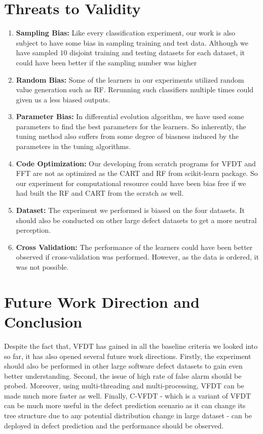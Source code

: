 \documentclass[sigplan]{acmart}\settopmatter{printfolios=true,printccs=false,printacmref=false}
\begin{document}
\section{Threats to Validity}
\begin{enumerate}
	\item \textbf{Sampling Bias: } Like every classification experiment, our work is also subject to have some bias in sampling training and test data. Although we have sampled $10$ disjoint training and testing datasets for each dataset, it could have been better if the sampling number was higher
	\item \textbf{Random Bias: } Some of the learners in our experiments utilized random value generation such as RF. Rerunning such classifiers multiple times could given us a less biased outputs.
	\item \textbf{Parameter Bias: } In differential evolution algorithm, we have used some parameters to find the best parameters for the learners. So inherently, the tuning method also suffers from some degree of biasness induced by the parameters in the tuning algorithms.
	\item \textbf{Code Optimization: } Our developing from scratch programs for VFDT and FFT are not as optimized as the CART and RF from scikit-learn package. So our experiment for computational resource could have been bias free if we had built the RF and CART from the scratch as well.
	\item \textbf{Dataset: } The experiment we performed is biased on the four datasets. It should also be conducted on other large defect datasets to get a more neutral perception.
	\item \textbf{Cross Validation: } The performance of the learners could have been better observed if cross-validation was performed. However, as the data is ordered, it was not possible.
\end{enumerate}

\section{Future Work Direction and Conclusion}
Despite the fact that, VFDT has gained in all the baseline criteria we looked into so far, it has also opened several future work directions. Firstly, the experiment should also be performed in other large software defect datasets to gain even better understanding. Second, the issue of high rate of false alarm should be probed. Moreover, using multi-threading and multi-processing, VFDT can be made much more faster as well. Finally, C-VFDT \cite{hulten2001mining} - which is a variant of VFDT can be much more useful in the defect prediction scenario as it can change its tree structure due to any potential distribution change in large dataset - can be deployed in defect prediction and the performance should be observed.



%
%
\end{document}
